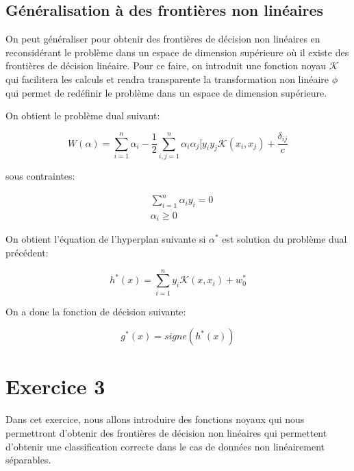 \documentclass{article}
\begin{document}
\begin{multicols}{2}
\subsection{Généralisation à des frontières non linéaires}\label{subsec:ex26}

On peut généraliser pour obtenir des frontières de décision non linéaires en
reconsidérant le problème dans un espace de dimension supérieure où il existe
des frontières de décision linéaire. Pour ce faire, on introduit une fonction
noyau $\mathcal{K}$ qui facilitera les calculs et rendra transparente la
transformation non linéaire $\phi$ qui permet de redéfinir le problème dans un
espace de dimension supérieure.

On obtient le problème dual suivant:

\begin{equation}
    W(\alpha) = \sum_{i = 1}^n \alpha_i - \frac{1}{2} \sum_{i,j = 1}^n
    \alpha_i \alpha_j [y_i y_j \mathcal{K}(x_i, x_j) + \frac{\delta_{ij}}{c}
\end{equation}

sous contraintes:

\begin{equation}
    \begin{split}
        & \sum_{i = 1}^n \alpha_i y_i = 0 \\
        & \alpha_i \geq 0
    \end{split}
\end{equation}

On obtient l'équation de l'hyperplan suivante si $\alpha^*$ est solution du
problème dual précédent:

\begin{equation}
    h^*(x) = \sum_{i = 1}^n y_i \mathcal{K}(x, x_i) + w_0^*
\end{equation}

On a donc la fonction de décision suivante:

\begin{equation}
    g^*(x) = signe(h^*(x))
\end{equation}

\section{Exercice 3}\label{sec:ex3}

Dans cet exercice, nous allons introduire des fonctions noyaux qui nous
permettront d'obtenir des frontières de décision non linéaires qui permettent
d'obtenir une classification correcte dans le cas de données non linéairement
séparables.


\end{multicols}
\end{document}
